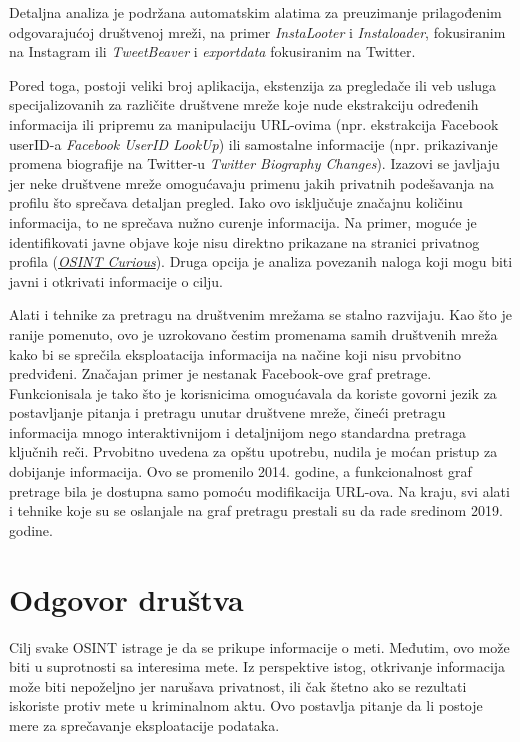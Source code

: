 \documentclass[fleqn, 12pt]{article}
\begin{document}
Detaljna analiza je podržana automatskim alatima za preuzimanje prilagođenim odgovarajućoj društvenoj mreži, na primer \textit{InstaLooter} i \textit{Instaloader}, fokusiranim na Instagram ili \textit{TweetBeaver} i \textit{exportdata} fokusiranim na Twitter.\newline

Pored toga, postoji veliki broj aplikacija, ekstenzija za pregledače ili veb usluga specijalizovanih za različite društvene mreže koje nude ekstrakciju određenih informacija ili pripremu za manipulaciju URL-ovima (npr. ekstrakcija Facebook userID-a \textit{Facebook UserID LookUp}) ili samostalne informacije (npr. prikazivanje promena biografije na Twitter-u \textit{Twitter Biography Changes}). Izazovi se javljaju jer neke društvene mreže omogućavaju primenu jakih privatnih podešavanja na profilu što sprečava detaljan pregled. Iako ovo isključuje značajnu količinu informacija, to ne sprečava nužno curenje informacija. Na primer, moguće je identifikovati javne objave koje nisu direktno prikazane na stranici privatnog profila (\textit{\href{https://www.osintcurio.us/}{OSINT Curious}}). Druga opcija je analiza povezanih naloga koji mogu biti javni i otkrivati informacije o cilju.\newline

Alati i tehnike za pretragu na društvenim mrežama se stalno razvijaju. Kao što je ranije pomenuto, ovo je uzrokovano čestim promenama samih društvenih mreža kako bi se sprečila eksploatacija informacija na načine koji nisu prvobitno predviđeni. Značajan primer je nestanak Facebook-ove graf pretrage. Funkcionisala je tako što je korisnicima omogućavala da koriste govorni jezik za postavljanje pitanja i pretragu unutar društvene mreže, čineći pretragu informacija mnogo interaktivnijom i detaljnijom nego standardna pretraga ključnih reči. Prvobitno uvedena za opštu upotrebu, nudila je moćan pristup za dobijanje informacija. Ovo se promenilo 2014. godine, a funkcionalnost graf pretrage bila je dostupna samo pomoću modifikacija URL-ova. Na kraju, svi alati i tehnike koje su se oslanjale na graf pretragu prestali su da rade sredinom 2019. godine.\newpage
\section{Odgovor društva}
Cilj svake OSINT istrage je da se prikupe informacije o meti. Međutim, ovo može biti u suprotnosti sa interesima mete. Iz perspektive istog, otkrivanje informacija može biti nepoželjno jer narušava privatnost, ili čak štetno ako se rezultati iskoriste protiv mete u kriminalnom aktu. Ovo postavlja pitanje da li postoje mere za sprečavanje eksploatacije podataka.
\end{document}
